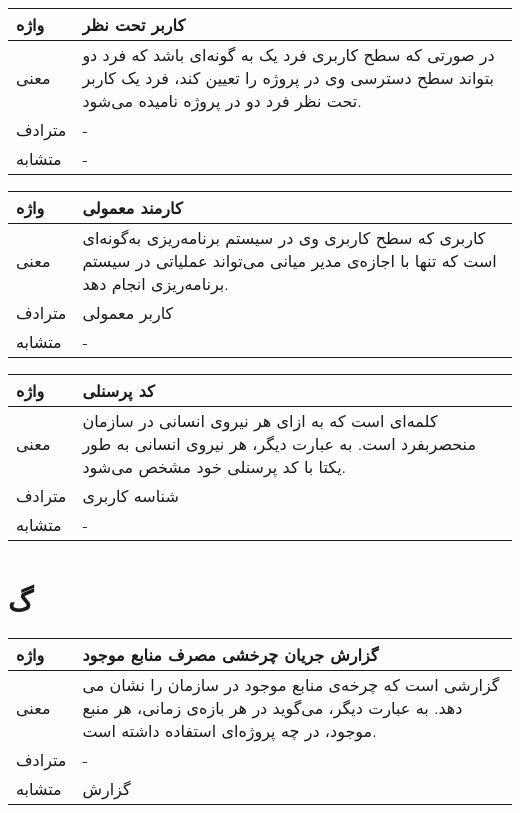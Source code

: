 \begin{table}[H]
	\centering
	\begin{tabular}{| p{1.5cm} | p{5cm} |}
		\hline
		واژه & کاربر تحت نظر \\
		\hline
		معنی  & در صورتی که سطح کاربری فرد یک به گونه‌ای باشد که فرد دو بتواند سطح دسترسی وی در پروژه را تعیین کند، فرد یک کاربر تحت نظر فرد دو در پروژه نامیده می‌شود. \\
		\hline
		مترادف & - \\
		\hline
		متشابه  & - \\
		\hline
	\end{tabular}
\end{table}

\begin{table}[H]
	\centering
	\begin{tabular}{| p{1.5cm} | p{5cm} |}
		\hline
		واژه & کارمند معمولی \\
		\hline
		معنی  & کاربری که سطح کاربری وی در سیستم برنامه‌ریزی به‌گونه‌ای است که تنها با اجازه‌ی مدیر میانی می‌تواند عملیاتی در سیستم برنامه‌ریزی انجام دهد. \\
		\hline
		مترادف & کاربر معمولی \\
		\hline
		متشابه  & - \\
		\hline
	\end{tabular}
\end{table}

\begin{table}[H]
	\centering
	\begin{tabular}{| p{1.5cm} | p{5cm} |}
		\hline
		واژه & کد پرسنلی \\
		\hline
		معنی  & کلمه‌ای است که به ازای هر نیروی انسانی در سازمان منحصربفرد است. به عبارت دیگر، هر نیروی انسانی به طور یکتا با کد پرسنلی خود مشخص می‌شود. \\
		\hline
		مترادف & شناسه کاربری \\
		\hline
		متشابه  & - \\
		\hline
	\end{tabular}
\end{table}

\section*{گ}%

\begin{table}[H]
	\centering
	\begin{tabular}{| p{1.5cm} | p{5cm} |}
		\hline
		واژه & گزارش جریان چرخشی مصرف منابع موجود \\
		\hline
		معنی  & گزارشی است که چرخه‌ی منابع موجود در سازمان را نشان می دهد. به عبارت دیگر، می‌گوید در هر بازه‌ی زمانی، هر منبع موجود، در چه پروژه‌ای استفاده داشته است. \\
		\hline
		مترادف & - \\
		\hline
		متشابه  & گزارش \\
		\hline
	\end{tabular}
\end{table}

